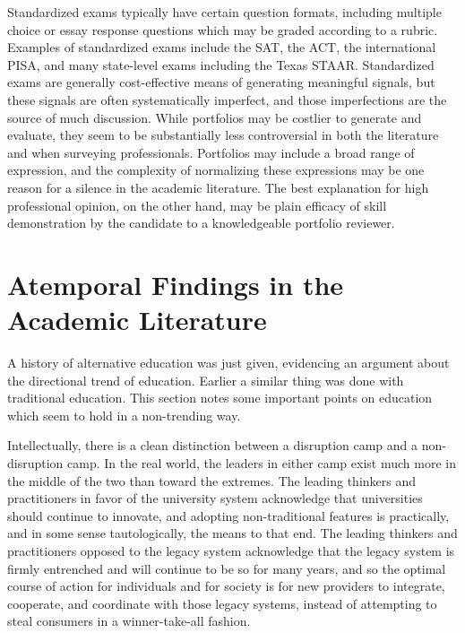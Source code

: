 \documentclass[AER]{/Users/zyl357/Documents/GitHub/research-dissertation-case-for-alt-ed/papers/alt-ed-survey/aea-latex-templates/AEA}
\begin{document}
Standardized exams typically have certain question formats, including
multiple choice or essay response questions which may be graded according
to a rubric. Examples of standardized exams include the SAT, the ACT, the
international PISA, and many state-level exams including the Texas STAAR.
Standardized exams are generally cost-effective means of generating
meaningful signals, but these signals are often systematically imperfect,
and those imperfections are the source of much discussion. While
portfolios may be costlier to generate and evaluate, they seem to be
substantially less controversial in both the literature and when surveying
professionals. Portfolios may include a broad range of expression, and the
complexity of normalizing these expressions may be one reason for a
silence in the academic literature. The best explanation for high
professional opinion, on the other hand, may be plain efficacy of skill
demonstration by the candidate to a knowledgeable portfolio reviewer.

\section{Atemporal Findings in the Academic Literature}

A history of alternative education was just given, evidencing an argument
about the directional trend of education. Earlier a similar thing was done
with traditional education. This section notes some important points on
education which seem to hold in a non-trending way.

Intellectually, there is a clean distinction between a disruption camp and
a non-disruption camp. In the real world, the leaders in either camp exist
much more in the middle of the two than toward the extremes. The leading
thinkers and practitioners in favor of the university system acknowledge
that universities should continue to innovate, and adopting
non-traditional features is practically, and in some sense tautologically,
the means to that end. The leading thinkers and practitioners opposed to
the legacy system acknowledge that the legacy system is firmly entrenched
and will continue to be so for many years, and so the optimal course of
action for individuals and for society is for new providers to integrate,
cooperate, and coordinate with those legacy systems, instead of attempting
to steal consumers in a winner-take-all fashion.
\end{document}
